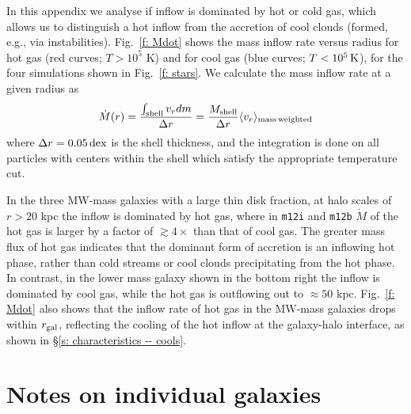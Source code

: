 \documentclass[fleqn,usenatbib]{mnras}
\newcommand{\Mdot}{\dot{M}}
\begin{document}
In this appendix we analyse if inflow is dominated by hot or cold gas, which allows us to distinguish a hot inflow from the accretion of cool clouds (formed, e.g., via instabilities).
Fig.~\ref{f: Mdot} shows the mass inflow rate versus radius for hot gas (red curves; $T>10^5$ K) and for cool gas (blue curves; $T < 10^5\,{\rm K}$),  for the four simulations shown in Fig.~\ref{f: stars}. 
We calculate the mass inflow rate at a given radius as
\begin{equation}
     \Mdot(r) = \frac{\int_{\rm shell} v_r dm}{\Delta r} = \frac{M_{\rm shell}}{\Delta r} \langle v_r\rangle_{\rm mass\, weighted}
     \label{e: Mdot}
\end{equation}
where $\Delta r=0.05\,{\rm dex}$ is the shell thickness, and the integration is done on all particles with centers within the shell which satisfy the appropriate temperature cut. 

In the three MW-mass galaxies with a large thin disk fraction, at halo scales of $r>20$ kpc the inflow is dominated by hot gas, where in \texttt{m12i} and \texttt{m12b} $\Mdot$ of the hot gas is larger by a factor of $\gtrsim 4\times$ than that of cool gas.
The greater mass flux of hot gas indicates that the dominant form of accretion is an inflowing hot phase, rather than cold streams or cool clouds precipitating from the hot phase.
In contrast, in the lower mass galaxy shown in the bottom right the inflow is dominated by cool gas, while the hot gas is outflowing out to $\approx50$ kpc.
Fig.~\ref{f: Mdot} also shows that the inflow rate of hot gas in the MW-mass galaxies drops within $r_{\rm gal}$, reflecting the cooling of the hot inflow at the galaxy-halo interface, as shown in \S\ref{s: characteristics -- cools}.

\section{Notes on individual galaxies}

\label{s: appendix-individual}
\end{document}
